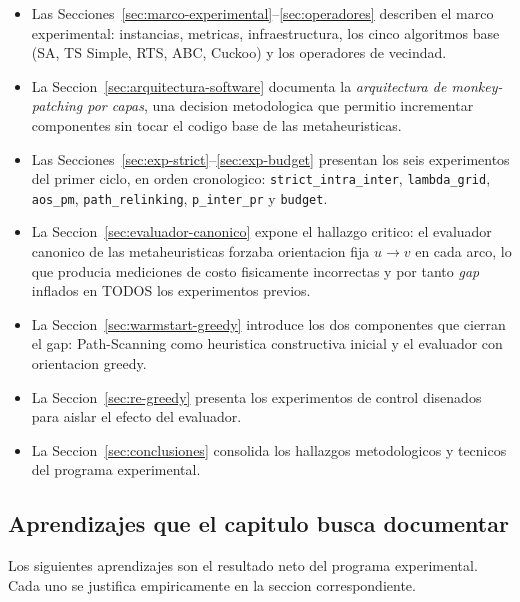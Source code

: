 \begin{itemize}
\item Las Secciones~\ref{sec:marco-experimental}--\ref{sec:operadores}
  describen el marco experimental: instancias, metricas,
  infraestructura, los cinco algoritmos base (SA, TS Simple, RTS, ABC,
  Cuckoo) y los operadores de vecindad.
\item La Seccion~\ref{sec:arquitectura-software} documenta la
  \emph{arquitectura de monkey-patching por capas}, una decision
  metodologica que permitio incrementar componentes sin tocar el
  codigo base de las metaheuristicas.
\item Las Secciones~\ref{sec:exp-strict}--\ref{sec:exp-budget}
  presentan los seis experimentos del primer ciclo, en orden
  cronologico: \texttt{strict\_intra\_inter},
  \texttt{lambda\_grid}, \texttt{aos\_pm}, \texttt{path\_relinking},
  \texttt{p\_inter\_pr} y \texttt{budget}.
\item La Seccion~\ref{sec:evaluador-canonico} expone el hallazgo
  critico: el evaluador canonico de las metaheuristicas forzaba
  orientacion fija $u \to v$ en cada arco, lo que producia
  mediciones de costo fisicamente incorrectas y por tanto \emph{gap}
  inflados en TODOS los experimentos previos.
\item La Seccion~\ref{sec:warmstart-greedy} introduce los dos
  componentes que cierran el gap: Path-Scanning como heuristica
  constructiva inicial y el evaluador con orientacion greedy.
\item La Seccion~\ref{sec:re-greedy} presenta los experimentos de
  control disenados para aislar el efecto del evaluador.
\item La Seccion~\ref{sec:conclusiones} consolida los hallazgos
  metodologicos y tecnicos del programa experimental.
\end{itemize}

\subsection{Aprendizajes que el capitulo busca documentar}

Los siguientes aprendizajes son el resultado neto del programa
experimental. Cada uno se justifica empiricamente en la seccion
correspondiente.

